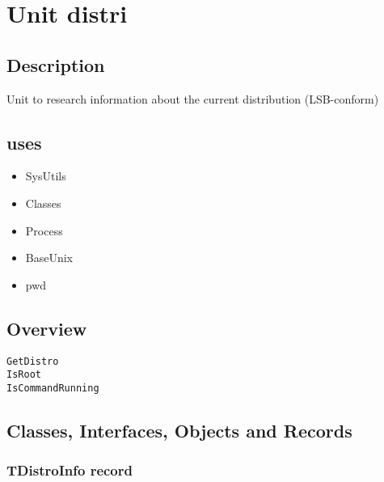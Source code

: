 \documentclass{report}
\newif\ifpdf
\begin{document}
\chapter{Unit distri}
\label{distri}
\section{Description}
Unit to research information about the current distribution (LSB{-}conform)
\section{uses}
\begin{itemize}
\item \begin{ttfamily}SysUtils\end{ttfamily}\item \begin{ttfamily}Classes\end{ttfamily}\item \begin{ttfamily}Process\end{ttfamily}\item \begin{ttfamily}BaseUnix\end{ttfamily}\item \begin{ttfamily}pwd\end{ttfamily}\end{itemize}
\section{Overview}
\begin{description}
\item[\texttt{\begin{ttfamily}TDistroInfo\end{ttfamily} record}]
\end{description}
\begin{description}
\item[\texttt{GetDistro}]
\item[\texttt{IsRoot}]
\item[\texttt{IsCommandRunning}]
\end{description}
\section{Classes, Interfaces, Objects and Records}
\ifpdf
\subsection*{\large{\textbf{TDistroInfo record}}\normalsize\hspace{1ex}\hrulefill}
\else
\end{document}
